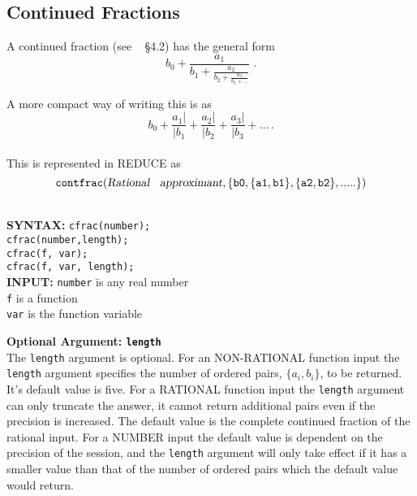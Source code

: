 \subsection{Continued Fractions}

A continued fraction (see ~\cite{PA} \S 4.2) has the general form
{\Large
\[b_0 + \frac{a_1}{b_1 +
         \frac{a_2}{b_2+
          \frac{a_3}{b_3 + \ldots
        }}}
\;.\]
}

A more compact way of writing this is as
\[b_0 + \frac{a_1|}{|b_1} + \frac{a_2|}{|b_2} + \frac{a_3|}{|b_3} + \ldots\,.\]
\\
%
This is represented in {\small REDUCE} as
\[{\tt
   contfrac(\text{\sl Rational\hspace{2mm} approximant},
                \{b0, \{a1,b1\}, \{a2,b2\},.....\})
}\]

\hypertarget{CONTFRAC:operator}{}
\hypertarget{CFRAC:operator}{}
\begin{tabbing}
\\
\textbf{SYNTAX:} \hspace{5mm} 
\= \texttt{cfrac(number);}\\
\> \texttt{cfrac(number,length);}\\
\> \texttt{cfrac(f, var);}\\
\> \texttt{cfrac(f, var, length);}\\[\baselineskip]

\textbf{INPUT:}
\> \texttt{number} \hspace{3mm} \= is any real number\\
\> \texttt{f}                   \> is a function\\
\> \texttt{var}                 \> is the function variable\\
\end{tabbing}

\textbf{Optional Argument: \texttt{length}}\\

The \texttt{length} argument is optional. 
For an NON-RATIONAL function input the \texttt{length} argument specifies
the number of ordered pairs, $\{a_i,b_i\}$, to be 
returned. It's default value is five.
For a RATIONAL function input the
\texttt{length} argument can only truncate the answer, it cannot
return additional pairs even if the precision is increased.
The default value is the complete continued fraction of the
rational input. For a NUMBER input the default value is 
dependent on the precision of the session, and the
\texttt{length} argument will only take effect if it has a smaller
value than that of the number of ordered pairs which the default
value would return.\\[\baselineskip]



